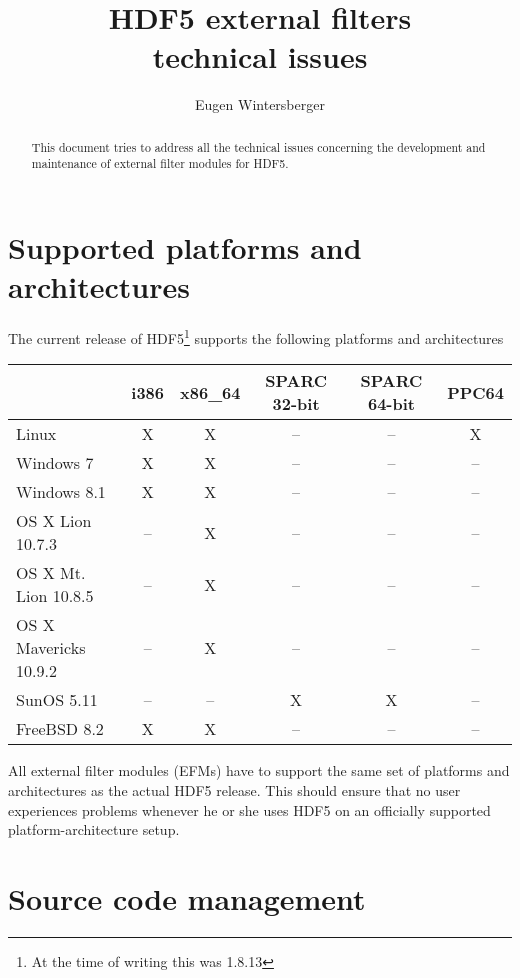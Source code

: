 \documentclass{scrartcl}
\title{
       {\huge HDF5 external filters}\\
       technical issues}
\author{Eugen Wintersberger}
\begin{document}
\maketitle
\begin{abstract}
    This document tries to address all the technical issues concerning 
    the development and maintenance of external filter modules for HDF5. 
\end{abstract}

\section{Supported platforms and architectures}

The current release of HDF5\footnote{At the time of writing this was 1.8.13} 
supports the following platforms and architectures
\begin{center}
\begin{tabular}{l|c|c|c|c|c}
    & i386 & x86\_64 & SPARC 32-bit & SPARC 64-bit & PPC64 \\
    \hline\hline
    Linux & X  &  X & -- & -- & X \\
    \hline
    Windows 7 & X  & X & -- & -- & -- \\
    \hline
    Windows 8.1 & X & X & -- & -- & -- \\
    \hline
    OS X Lion 10.7.3 & -- & X & -- & -- & -- \\
    \hline
    OS X Mt. Lion 10.8.5 & -- & X & -- & -- & -- \\
    \hline
    OS X Mavericks 10.9.2 & -- & X & -- & -- & -- \\
    \hline
    SunOS 5.11 & -- & -- & X & X & -- \\
    \hline
    FreeBSD 8.2 & X & X & -- & -- & -- \\
    \hline
\end{tabular}
\end{center}
All external filter modules (EFMs) have to support the same set of platforms and 
architectures as the actual HDF5 release. This should ensure that no user 
experiences problems whenever he or she uses HDF5 on an officially supported
platform-architecture setup.

\section{Source code management}
\end{document}
